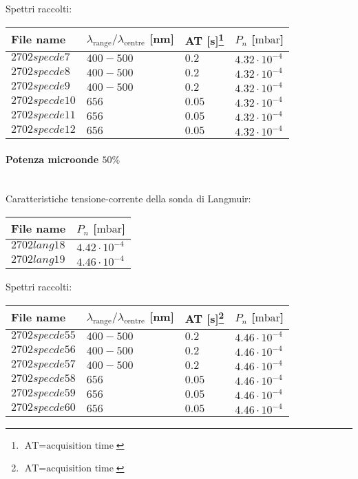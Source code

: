 Spettri raccolti:
\begin{center}
\begin{tabular}{p{3cm}p{4cm}p{2cm}p{3cm}}
\toprule
File name	&$\lambda_\text{range}\text{/}\lambda_\text{centre}$ [nm] 	&AT [s]\footnote{$\text{AT}=\text{acquisition time}$} &$P_n$ [$\si{\milli\bar}$]\\
\midrule
$2702specde7$	&$400-500$	&$0.2$		&$4.32\cdot10^{-4}$\\
$2702specde8$	&$400-500$	&$0.2$		&$4.32\cdot10^{-4}$\\
$2702specde9$	&$400-500$	&$0.2$		&$4.32\cdot10^{-4}$\\
$2702specde10$	&$656$		&$0.05$		&$4.32\cdot10^{-4}$\\
$2702specde11$	&$656$		&$0.05$		&$4.32\cdot10^{-4}$\\
$2702specde12$	&$656$		&$0.05$		&$4.32\cdot10^{-4}$\\
\bottomrule
\end{tabular}
\end{center}

\paragraph*{Potenza microonde $\text{50\%}$} ~\\
Caratteristiche tensione-corrente della sonda di Langmuir:
\begin{center}
\begin{tabular}{p{3cm}p{3cm}}
\toprule
File name	&$P_n$ [$\si{\milli\bar}$]\\
\midrule
$2702lang18$	&$4.42\cdot10^{-4}$\\
$2702lang19$	&$4.46\cdot10^{-4}$\\
\bottomrule
\end{tabular}
\end{center}

Spettri raccolti:
\begin{center}
\begin{tabular}{p{3cm}p{4cm}p{2cm}p{3cm}}
\toprule
File name	&$\lambda_\text{range}\text{/}\lambda_\text{centre}$ [nm] 	&AT [s]\footnote{$\text{AT}=\text{acquisition time}$} &$P_n$ [$\si{\milli\bar}$]\\
\midrule
$2702specde55$	&$400-500$	&$0.2$		&$4.46\cdot10^{-4}$\\
$2702specde56$	&$400-500$	&$0.2$		&$4.46\cdot10^{-4}$\\
$2702specde57$	&$400-500$	&$0.2$		&$4.46\cdot10^{-4}$\\
$2702specde58$	&$656$		&$0.05$		&$4.46\cdot10^{-4}$\\
$2702specde59$	&$656$		&$0.05$		&$4.46\cdot10^{-4}$\\
$2702specde60$	&$656$		&$0.05$		&$4.46\cdot10^{-4}$\\
\bottomrule
\end{tabular}
\end{center}

